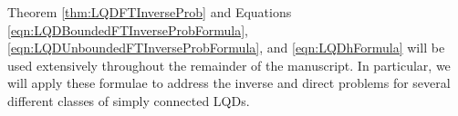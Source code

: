 \documentclass{article}
\numberwithin{equation}{section}
\begin{document}
Theorem \ref{thm:LQDFTInverseProb} and Equations \ref{eqn:LQDBoundedFTInverseProbFormula}, \ref{eqn:LQDUnboundedFTInverseProbFormula}, and \ref{eqn:LQDhFormula} will be used extensively throughout the remainder of the manuscript. In particular, we will apply these formulae to address the inverse and direct problems for several different classes of simply connected LQDs.

\end{document}
